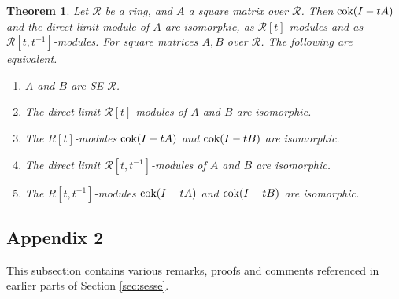 \documentclass{amsart}
\newtheorem{thm}[equation]{Theorem}
\theoremstyle{definition}
\theoremstyle{definition}
\newcommand{\cok}{\textnormal{cok}}
\numberwithin{equation}{subsection}
\begin{document}
\begin{thm} \label{RmodulestructureforSE}
  Let $\mathcal R$ be a ring,
  and $A$ a square matrix over $\mathcal R$. Then
  $\cok(I-tA)$ and the direct limit  module of $A$ are
  isomorphic, as $\mathcal R[t]$-modules and as
  $\mathcal R[t,t^{-1}]$-modules. For square matrices $A,B$
   over
  $\mathcal R$.
  The following are equivalent.
  \begin{enumerate}
  \item
    $A$ and $B$ are SE-$\mathcal R$.
  \item
    The direct limit  $\mathcal R[t]$-modules of $A$ and $B$
    are isomorphic.
  \item The $R[t]$-modules
    $\cok (I-tA)$ and $\cok(I-tB)$ are isomorphic.
  \item
    The direct limit  $\mathcal R[t,t^{-1}]$-modules of $A$ and $B$
    are isomorphic.
  \item
    The $R[t,t^{-1}]$-modules
    $\cok (I-tA)$ and $\cok(I-tB)$ are isomorphic.
      \end{enumerate}
  \end{thm}







\subsection{Appendix 2} \label{a2}

This subsection contains various remarks, proofs and comments referenced
in earlier parts of Section \ref{sec:sesse}.
\end{document}
